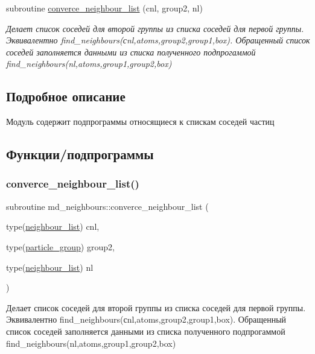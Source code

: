 \begin{DoxyCompactItemize}
subroutine \mbox{\hyperlink{namespacemd__neighbours_a3f6d619145cba9b77814f398056c243f}{converce\+\_\+neighbour\+\_\+list}} (cnl, group2, nl)
\begin{DoxyCompactList}\small\item\em Делает список соседей для второй группы из списка соседей для первой группы.  Эквивалентно find\+\_\+neighbours(сnl,atoms,group2,group1,box). Обращенный список соседей заполняется данными из списка полученного подпрогаммой find\+\_\+neighbours(nl,atoms,group1,group2,box) \end{DoxyCompactList}\end{DoxyCompactItemize}


\subsection{Подробное описание}
Модуль содержит подпрограммы относящиеся к спискам соседей частиц 

\subsection{Функции/подпрограммы}
\mbox{\label{namespacemd__neighbours_a3f6d619145cba9b77814f398056c243f}} 
\subsubsection{\texorpdfstring{converce\+\_\+neighbour\+\_\+list()}{converce\_neighbour\_list()}}
{\footnotesize\ttfamily subroutine md\+\_\+neighbours\+::converce\+\_\+neighbour\+\_\+list (\begin{DoxyParamCaption}\item[{type(\mbox{\hyperlink{structmd__general_1_1neighbour__list}{neighbour\+\_\+list}})}]{cnl,  }\item[{type(\mbox{\hyperlink{structmd__general_1_1particle__group}{particle\+\_\+group}})}]{group2,  }\item[{type(\mbox{\hyperlink{structmd__general_1_1neighbour__list}{neighbour\+\_\+list}})}]{nl }\end{DoxyParamCaption})}



Делает список соседей для второй группы из списка соседей для первой группы.  Эквивалентно find\+\_\+neighbours(сnl,atoms,group2,group1,box). Обращенный список соседей заполняется данными из списка полученного подпрогаммой find\+\_\+neighbours(nl,atoms,group1,group2,box) 



